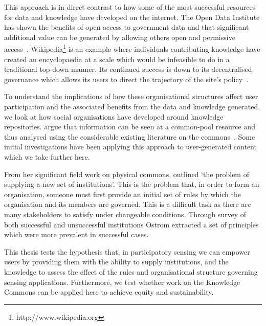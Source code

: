 This approach is in direct contrast to how some of the most successful resources for data and knowledge have developed on the internet. 
The Open Data Institute has shown the benefits of open access to government data and that significant additional value can be generated by allowing others open and permissive access~\citep{Shadbolt2012}. 
Wikipedia\footnote{http://www.wikipedia.org} is an example where individuals contributing knowledge have created an encyclopaedia at a scale which would be infeasible to do in a traditional top-down manner. 
Its continued success is down to its decentralised governance which allows its users to direct the trajectory of the site's policy~\citep{Famiglietti2011}.

To understand the implications of how these organisational structures affect user participation and the associated benefits from the data and knowledge generated, we look at how social organisations have developed around knowledge repositories.
 argue that information can be seen at a common-pool resource and thus analysed using the considerable existing literature on the commons~\citep{Hess2007}. 
Some initial investigations have been applying this approach to user-generated content~\citep{Pitt2012} which we take further here.

From her significant field work on physical commons, \citet[p.42]{Ostrom1990} outlined `the problem of supplying a new set of institutions'. 
This is the problem that, in order to form an organisation, someone must first provide an initial set of rules by which the organisation and its members are governed.
This is a difficult task as there are many stakeholders to satisfy under changeable conditions. Through survey of both successful and unsuccessful institutions Ostrom extracted a set of principles which were more prevalent in successful cases.

This thesis tests the hypothesis that, in participatory sensing we can empower
users by providing them with the ability to supply institutions, and the
knowledge to assess the effect of the rules and organisational structure
governing sensing applications. Furthermore, we test whether
 work on the Knowledge Commons can be applied here to
achieve equity and sustainability.



